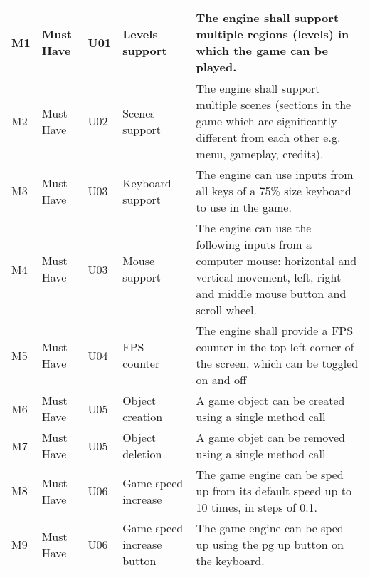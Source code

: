 \documentclass{article} %
\begin{document}
\begin{longtable}{|p{}|p{}|p{}|p{}|p{}|}
    M1                          & Must Have                          & U01                & Levels support              & The engine shall support multiple regions (levels) in which the game can be played.                                                                         \\ \hline
    M2                          & Must Have                          & U02                & Scenes support              & The engine shall support multiple scenes (sections in the game which are significantly different from each other e.g. menu, gameplay, credits).             \\ \hline
    M3                          & Must Have                          & U03                & Keyboard support            & The engine can use inputs from all keys of a 75\% size keyboard to use in the game. \\ \hline
    M4                          & Must Have                          & U03                & Mouse support               & The engine can use the following inputs from a computer mouse: horizontal and vertical movement, left, right and middle mouse button and scroll wheel.      \\ \hline
    M5                          & Must Have                          & U04                & FPS counter                 & The engine shall provide a FPS counter in the top left corner of the screen, which can be toggled on and off                                               \\ \hline
    M6                          & Must Have                          & U05                & Object creation             & A game object can be created using a single method call                                                                                                     \\ \hline
    M7                          & Must Have                          & U05                & Object deletion             & A game objet can be removed using a single method call                                                                                                      \\ \hline
    M8                          & Must Have                          & U06                & Game speed increase         & The game engine can be sped up from its default speed up to 10 times, in steps of 0.1.                                                                      \\ \hline
    M9                          & Must Have                          & U06                & Game speed increase button  & The game engine can be sped up using the pg up button on the keyboard.                                                                                      \\ \hline

\end{longtable}
\end{document}
